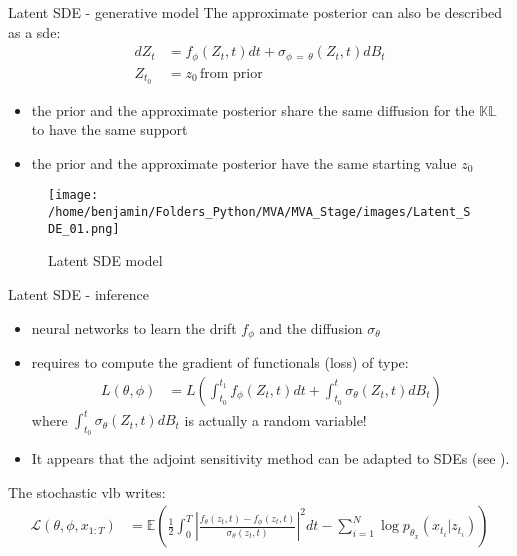 \begin{frame}{Latent SDE - generative model}
    The approximate posterior can also be described as a \gls{sde}:
        \begin{align}
            dZ_t &= f_{\phi}(Z_t,t)dt + \sigma_{\phi \, = \, \theta}(Z_t,t)dB_t \\
            Z_{t_0} &= z_0 \, \text{from prior}
        \end{align}
        \begin{itemize}
            \item the prior and the approximate posterior share the same diffusion for the $\mathbb{KL}$ to have the same support
            \item the prior and the approximate posterior have the same starting value $z_0$
        \end{itemize}
    \begin{figure}[H]
        \centering
        \texttt{[image: /home/benjamin/Folders\_Python/MVA/MVA\_Stage/images/Latent\_SDE\_01.png]}
        \caption{Latent SDE model}
        \label{fig:Latent SDE}
    \end{figure}
\end{frame}

\begin{frame}{Latent SDE - inference}
    \begin{itemize}
        \item neural networks to learn the drift $f_{\phi}$ and the diffusion $\sigma_{\theta}$
        \item requires to compute the gradient of functionals (loss) of type:
            \begin{align}
                L(\theta, \phi) &= L \left( \int_{t_0}^{t_1} f_{\phi}(Z_t, t)dt + \int_{t_0}^{t} \sigma_{\theta}(Z_t,t)dB_t \right)
            \end{align}
            where $\int_{t_0}^{t} \sigma_{\theta}(Z_t,t)dB_t$ is actually a random variable!
        \item It appears that the adjoint sensitivity method can be adapted to SDEs (see \cite{li_scalable_2020}).
    \end{itemize}
    
    The stochastic \gls{vlb} writes:
    \begin{align}
        \mathcal{L}(\theta, \phi, x_{1:T}) &= \mathbb{E} \left(
            \frac{1}{2}\int_{0}^{T} \left| \frac{f_{\theta}(z_t,t) - f_{\phi}(z_t,t)}{\sigma_{\theta}(z_t,t)} \right|^{2} dt  - 
            \sum_{i=1}^{N} \log{p_{\theta_x}}(x_{t_i} \vert z_{t_i})
            \right)
    \end{align}
\end{frame}